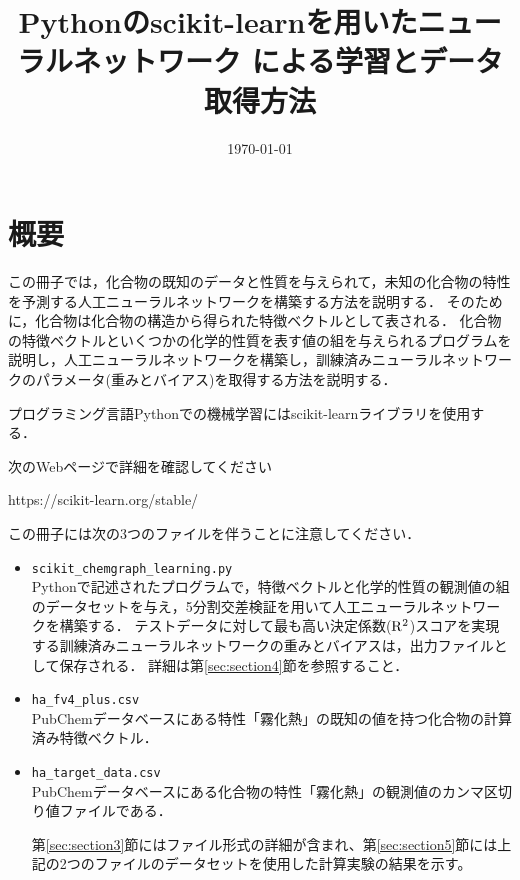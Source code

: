 \documentclass[11pt,titlepage,dvipdfmx,twoside]{jarticle}
\title{\Huge{Pythonのscikit-learnを用いたニューラルネットワーク
による学習とデータ取得方法}}
\begin{document}
\makeatletter 
\let\c@lstlisting\c@figure
\makeatother

\date{\today}

\maketitle


\thispagestyle{empty}
\tableofcontents
\clearpage


\section{概要}
この冊子では，化合物の既知のデータと性質を与えられて，未知の化合物の特性を予測する人工ニューラルネットワークを構築する方法を説明する．
そのために，化合物は化合物の構造から得られた特徴ベクトルとして表される．
化合物の特徴ベクトルといくつかの化学的性質を表す値の組を与えられるプログラムを説明し，人工ニューラルネットワークを構築し，訓練済みニューラルネットワークのパラメータ(重みとバイアス)を取得する方法を説明する．

プログラミング言語Pythonでの機械学習にはscikit-learnライブラリを使用する．

次のWebページで詳細を確認してください

https://scikit-learn.org/stable/

この冊子には次の3つのファイルを伴うことに注意してください．

\begin{itemize}
\item {\tt scikit\_chemgraph\_learning.py}\\
Pythonで記述されたプログラムで，特徴ベクトルと化学的性質の観測値の組のデータセットを与え，5分割交差検証を用いて人工ニューラルネットワークを構築する．
テストデータに対して最も高い決定係数(${\rm R}^2$)スコアを実現する訓練済みニューラルネットワークの重みとバイアスは，出力ファイルとして保存される．
詳細は第\ref{sec:section4}節を参照すること．

\item {\tt ha\_fv4\_plus.csv} \\
PubChemデータベースにある特性「霧化熱」の既知の値を持つ化合物の計算済み特徴ベクトル．

\item {\tt ha\_target\_data.csv}\\
PubChemデータベースにある化合物の特性「霧化熱」の観測値のカンマ区切り値ファイルである．

 \medskip 
第\ref{sec:section3}節にはファイル形式の詳細が含まれ、第\ref{sec:section5}節には上記の2つのファイルのデータセットを使用した計算実験の結果を示す。
\end{itemize}
\end{document}
